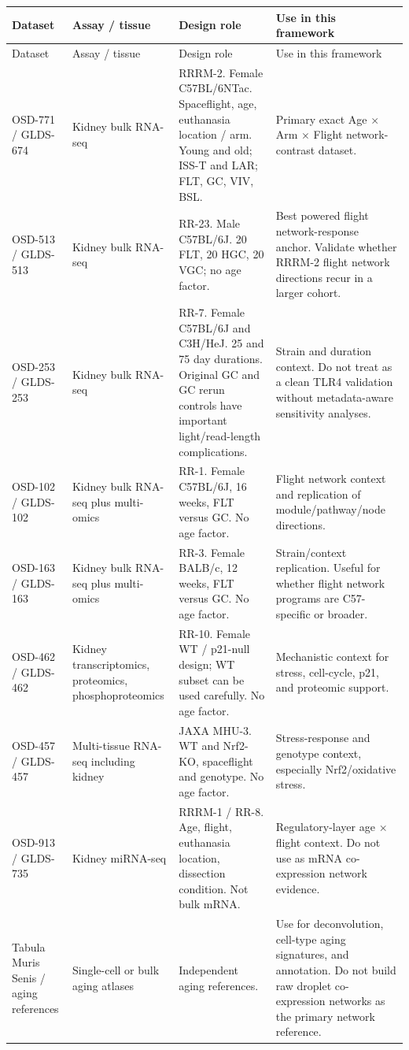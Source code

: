 \documentclass[11pt]{article}
\begin{document}
\begin{longtable}{p{}p{}p{}p{}}
\toprule
Dataset & Assay / tissue & Design role & Use in this framework \\
\midrule
\endfirsthead
\toprule
Dataset & Assay / tissue & Design role & Use in this framework \\
\midrule
\endhead
OSD-771 / GLDS-674 &
Kidney bulk RNA-seq &
RRRM-2. Female C57BL/6NTac. Spaceflight, age, euthanasia location / arm.
Young and old; ISS-T and LAR; FLT, GC, VIV, BSL. &
Primary exact Age $\times$ Arm $\times$ Flight network-contrast dataset. \\
\addlinespace
OSD-513 / GLDS-513 &
Kidney bulk RNA-seq &
RR-23. Male C57BL/6J. 20 FLT, 20 HGC, 20 VGC; no age factor. &
Best powered flight network-response anchor. Validate whether RRRM-2 flight
network directions recur in a larger cohort. \\
\addlinespace
OSD-253 / GLDS-253 &
Kidney bulk RNA-seq &
RR-7. Female C57BL/6J and C3H/HeJ. 25 and 75 day durations. Original GC and GC
rerun controls have important light/read-length complications. &
Strain and duration context. Do not treat as a clean TLR4 validation without
metadata-aware sensitivity analyses. \\
\addlinespace
OSD-102 / GLDS-102 &
Kidney bulk RNA-seq plus multi-omics &
RR-1. Female C57BL/6J, 16 weeks, FLT versus GC. No age factor. &
Flight network context and replication of module/pathway/node directions. \\
\addlinespace
OSD-163 / GLDS-163 &
Kidney bulk RNA-seq plus multi-omics &
RR-3. Female BALB/c, 12 weeks, FLT versus GC. No age factor. &
Strain/context replication. Useful for whether flight network programs are
C57-specific or broader. \\
\addlinespace
OSD-462 / GLDS-462 &
Kidney transcriptomics, proteomics, phosphoproteomics &
RR-10. Female WT / p21-null design; WT subset can be used carefully. No age
factor. &
Mechanistic context for stress, cell-cycle, p21, and proteomic support. \\
\addlinespace
OSD-457 / GLDS-457 &
Multi-tissue RNA-seq including kidney &
JAXA MHU-3. WT and Nrf2-KO, spaceflight and genotype. No age factor. &
Stress-response and genotype context, especially Nrf2/oxidative stress. \\
\addlinespace
OSD-913 / GLDS-735 &
Kidney miRNA-seq &
RRRM-1 / RR-8. Age, flight, euthanasia location, dissection condition. Not
bulk mRNA. &
Regulatory-layer age $\times$ flight context. Do not use as mRNA co-expression
network evidence. \\
\addlinespace
Tabula Muris Senis / aging references &
Single-cell or bulk aging atlases &
Independent aging references. &
Use for deconvolution, cell-type aging signatures, and annotation. Do not build
raw droplet co-expression networks as the primary network reference. \\
\bottomrule
\end{longtable}
\end{document}
